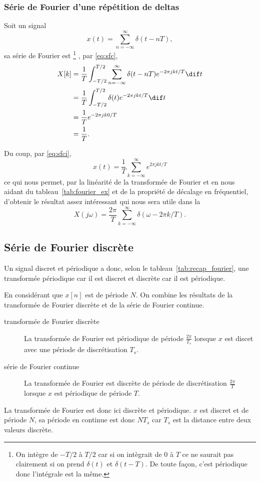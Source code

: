 \subsubsection{Série de Fourier d'une répétition de deltas}
\label{sec:deltas}
Soit un signal
\[ x(t) = \sum_{n=-\infty}^\infty \delta(t-nT), \]
sa série de Fourier est
\footnote{On intègre de $-T/2$ à $T/2$ car si on intègrait
de $0$ à $T$ ce ne saurait pas clairement si on prend $\delta(t)$ et
$\delta(t-T)$.
De toute façon, c'est périodique donc l'intégrale est la même.}
, par \eqref{eq:sfc},
\begin{align*}
  X[k] & = \frac{1}{T}\int_{-T/2}^{T/2} \sum_{n=-\infty}^\infty \delta(t-nT)
  e^{-2\pi jkt/T} \dif t\\
  & = \frac{1}{T}\int_{-T/2}^{T/2} \delta(t) e^{-2\pi jkt/T} \dif t\\
  & = \frac{1}{T} e^{-2\pi jk0/T}\\
  & = \frac{1}{T}.
\end{align*}

Du coup, par \eqref{eq:sfci},
\[ x(t) = \frac{1}{T}\sum_{k=-\infty}^\infty e^{2\pi jkt/T} \]
ce qui nous permet,
par la linéarité de la transformée de Fourier et en nous aidant du
tableau~\ref{tab:fourier_ex} et de la propriété de décalage en fréquentiel,
d'obtenir le résultat assez intéressant
qui nous sera utile dans la 
\[ X(j\omega) = \frac{2\pi}{T}
\sum_{k=-\infty}^\infty \delta(\omega-2\pi k/T). \]

\subsection{Série de Fourier discrète}
\label{sec:sfd}
Un signal discret et périodique a donc,
selon le tableau~\ref{tab:recap_fourier}, une transformée
périodique car il est discret et discrète car il est périodique.

En considérant que $x[n]$ est de période $N$.
On combine les résultats de la transformée de Fourier discrète
et de la série de Fourier continue.
\begin{description}
  \item[transformée de Fourier discrète]
    La transformée de Fourier est périodique de période $\frac{2\pi}{T_s}$
    lorsque $x$ est discet avec une période de discrétisation $T_s$.
  \item[série de Fourier continue]
    La transformée de Fourier est discrète de période de discrétisation
    $\frac{2\pi}{T}$ lorsque $x$ est périodique de période $T$.
\end{description}
La transformée de Fourier est donc ici discrète et périodique.
$x$ est discret et de période $N$, sa période en continue est donc $NT_s$
car $T_s$ est la distance entre deux valeurs discrète.

